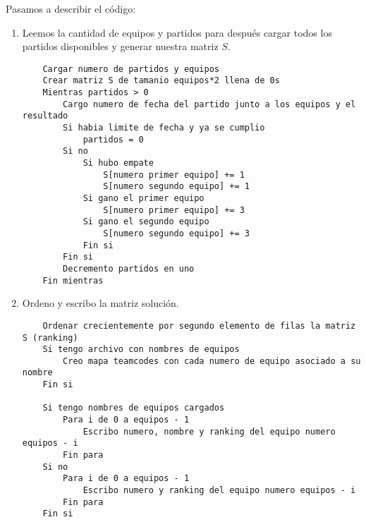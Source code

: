 Pasamos a describir el código:

\begin{enumerate}
	\item Leemos la cantidad de equipos y partidos para después cargar todos los
	partidos disponibles y generar nuestra matriz $S$.
	\begin{lstlisting}
	Cargar numero de partidos y equipos
	Crear matriz S de tamanio equipos*2 llena de 0s
	Mientras partidos > 0
		Cargo numero de fecha del partido junto a los equipos y el resultado
		Si habia limite de fecha y ya se cumplio
			partidos = 0
		Si no
			Si hubo empate
				S[numero primer equipo] += 1
				S[numero segundo equipo] += 1
			Si gano el primer equipo
				S[numero primer equipo] += 3
			Si gano el segundo equipo
				S[numero segundo equipo] += 3
			Fin si
		Fin si
		Decremento partidos en uno
	Fin mientras
	\end{lstlisting}

	\item Ordeno y escribo la matriz solución.
	\begin{lstlisting}
	Ordenar crecientemente por segundo elemento de filas la matriz S (ranking)
	Si tengo archivo con nombres de equipos
		Creo mapa teamcodes con cada numero de equipo asociado a su nombre
	Fin si

	Si tengo nombres de equipos cargados
		Para i de 0 a equipos - 1
			Escribo numero, nombre y ranking del equipo numero equipos - i
		Fin para
	Si no
		Para i de 0 a equipos - 1
			Escribo numero y ranking del equipo numero equipos - i
		Fin para
	Fin si
	\end{lstlisting}

\end{enumerate}
